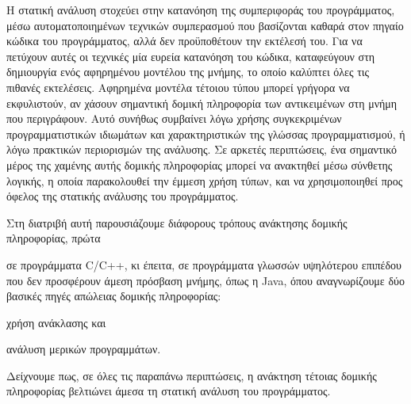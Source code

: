 

Η στατική ανάλυση στοχεύει στην κατανόηση της συμπεριφοράς του
προγράμματος, μέσω αυτοματοποιημένων τεχνικών συμπερασμού που βασίζονται
καθαρά στον πηγαίο κώδικα του προγράμματος, αλλά δεν προϋποθέτουν
την εκτέλεσή του. Για να πετύχουν αυτές οι τεχνικές μία
ευρεία κατανόηση του κώδικα, καταφεύγουν στη δημιουργία ενός
αφηρημένου μοντέλου της μνήμης, το οποίο καλύπτει όλες τις πιθανές
εκτελέσεις. Αφηρημένα μοντέλα τέτοιου τύπου μπορεί γρήγορα να
εκφυλιστούν, αν χάσουν σημαντική δομική πληροφορία των αντικειμένων
στη μνήμη που περιγράφουν. Αυτό συνήθως συμβαίνει λόγω χρήσης
συγκεκριμένων προγραμματιστικών ιδιωμάτων και χαρακτηριστικών της
γλώσσας προγραμματισμού, ή λόγω πρακτικών περιορισμών της ανάλυσης.
Σε αρκετές περιπτώσεις, ένα σημαντικό μέρος της χαμένης αυτής δομικής
πληροφορίας μπορεί να ανακτηθεί μέσω σύνθετης λογικής, η οποία
παρακολουθεί την έμμεση χρήση τύπων, και να χρησιμοποιηθεί προς όφελος
της στατικής ανάλυσης του προγράμματος.

Στη διατριβή αυτή παρουσιάζουμε διάφορους τρόπους ανάκτησης δομικής
πληροφορίας, πρώτα
\begin{inparaenum}[(1)]
\item σε προγράμματα {\en C/C++}, κι έπειτα, σε προγράμματα γλωσσών
  υψηλότερου επιπέδου που δεν προσφέρουν άμεση πρόσβαση μνήμης, όπως η
  {\en Java}, όπου αναγνωρίζουμε δύο βασικές πηγές απώλειας δομικής
  πληροφορίας:
\item χρήση ανάκλασης και
\item ανάλυση μερικών προγραμμάτων.
\end{inparaenum}
Δείχνουμε πως, σε όλες τις παραπάνω περιπτώσεις, η ανάκτηση τέτοιας
δομικής πληροφορίας βελτιώνει άμεσα τη στατική ανάλυση του
προγράμματος.

